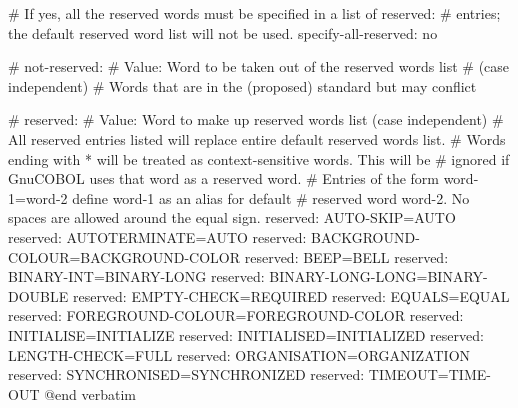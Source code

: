 # If yes, all the reserved words must be specified in a list of reserved:
# entries; the default reserved word list will not be used.
specify-all-reserved: no

# not-reserved:
# Value: Word to be taken out of the reserved words list
# (case independent)
# Words that are in the (proposed) standard but may conflict

# reserved:
# Value: Word to make up reserved words list (case independent)
# All reserved entries listed will replace entire default reserved words list.
#   Words ending with * will be treated as context-sensitive words. This will be
# ignored if GnuCOBOL uses that word as a reserved word.
#   Entries of the form word-1=word-2 define word-1 as an alias for default
# reserved word word-2. No spaces are allowed around the equal sign.
reserved:	AUTO-SKIP=AUTO
reserved:	AUTOTERMINATE=AUTO
reserved:	BACKGROUND-COLOUR=BACKGROUND-COLOR
reserved:	BEEP=BELL
reserved:	BINARY-INT=BINARY-LONG
reserved:	BINARY-LONG-LONG=BINARY-DOUBLE
reserved:	EMPTY-CHECK=REQUIRED
reserved:	EQUALS=EQUAL
reserved:	FOREGROUND-COLOUR=FOREGROUND-COLOR
reserved:	INITIALISE=INITIALIZE
reserved:	INITIALISED=INITIALIZED
reserved:	LENGTH-CHECK=FULL
reserved:	ORGANISATION=ORGANIZATION
reserved:	SYNCHRONISED=SYNCHRONIZED
reserved:	TIMEOUT=TIME-OUT
@end verbatim

